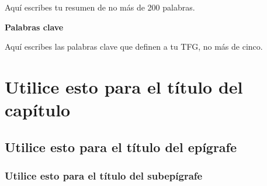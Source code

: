 \documentclass[13pt,a4paper]{report}
\begin{document}
Aquí escribes tu resumen de no más de 200 palabras.

\vspace{12pt}

{\fontsize{16}{19.2}\selectfont \textbf{Palabras clave}}

\vspace{12pt}

Aquí escribes las palabras clave que definen a tu TFG, no más de cinco.

\newpage  


\section{Utilice esto para el título del capítulo} 

\subsection*{Utilice esto para el título del epígrafe} 


\subsubsection*{Utilice esto para el título del subepígrafe} 
\end{document}
